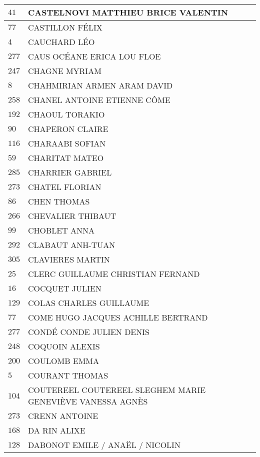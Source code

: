 \begin{xltabular}{\linewidth}{|l|X|}
    \hline
    $41$ & CASTELNOVI MATTHIEU BRICE VALENTIN \\
    \hline
    $77$ & CASTILLON FÉLIX \\
    \hline
    $4$ & CAUCHARD LÉO \\
    \hline
    $277$ & CAUS OCÉANE ERICA LOU FLOE \\
    \hline
    $247$ & CHAGNE MYRIAM \\
    \hline
    $8$ & CHAHMIRIAN ARMEN ARAM DAVID \\
    \hline
    $258$ & CHANEL ANTOINE ETIENNE CÔME \\
    \hline
    $192$ & CHAOUL TORAKIO \\
    \hline
    $90$ & CHAPERON CLAIRE \\
    \hline
    $116$ & CHARAABI SOFIAN \\
    \hline
    $59$ & CHARITAT MATEO \\
    \hline
    $285$ & CHARRIER GABRIEL \\
    \hline
    $273$ & CHATEL FLORIAN \\
    \hline
    $86$ & CHEN THOMAS \\
    \hline
    $266$ & CHEVALIER THIBAUT \\
    \hline
    $99$ & CHOBLET ANNA \\
    \hline
    $292$ & CLABAUT ANH-TUAN \\
    \hline
    $305$ & CLAVIERES MARTIN \\
    \hline
    $25$ & CLERC GUILLAUME CHRISTIAN FERNAND \\
    \hline
    $16$ & COCQUET JULIEN \\
    \hline
    $129$ & COLAS CHARLES GUILLAUME \\
    \hline
    $77$ & COME HUGO JACQUES ACHILLE BERTRAND \\
    \hline
    $277$ & CONDÉ CONDE JULIEN DENIS \\
    \hline
    $248$ & COQUOIN ALEXIS \\
    \hline
    $200$ & COULOMB EMMA \\
    \hline
    $5$ & COURANT THOMAS \\
    \hline
    $104$ & COUTEREEL COUTEREEL SLEGHEM MARIE GENEVIÈVE VANESSA AGNÈS \\
    \hline
    $273$ & CRENN ANTOINE \\
    \hline
    $168$ & DA RIN ALIXE \\
    \hline
    $128$ & DABONOT EMILE / ANAËL / NICOLIN \\
    \hline

\end{xltabular}
